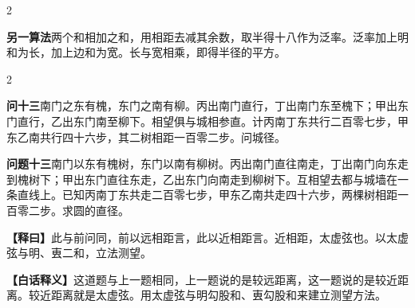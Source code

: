 \documentclass[11pt,a4paper]{article}
\newcommand{\WenQuestion}[1]{\textbf{\textcolor{classicalcolor}{#1}}}
\newcommand{\BaiQuestion}[1]{\textbf{\textcolor{moderncolor}{#1}}}
\newcommand{\WenExplain}{\textcolor{classicalcolor}{\textbf{【释曰】}}}
\newcommand{\BaiExplain}{\textcolor{moderncolor}{\textbf{【白话释义】}}}
\begin{document}
\begin{paracol}{2}
\begin{tcolorbox}[colback=blue!5,colframe=blue!40!black,boxrule=0.3pt]
\vspace{0.3em}
\textbf{另一算法}\quad 两个和相加之和，用相距去减其余数，取半得十八作为泛率。泛率加上明和为长，加上边和为宽。长与宽相乘，即得半径的平方。
\end{tcolorbox}

\end{paracol}

\vspace{0.5em}

\begin{paracol}{2}

\switchcolumn*
\begin{tcolorbox}[colback=red!3,colframe=red!30!black,boxrule=0.3pt]
\WenQuestion{问十三}\quad 南门之东有槐，东门之南有柳。丙出南门直行，丁出南门东至槐下；甲出东门直行，乙出东门南至柳下。相望俱与城相参直。计丙南丁东共行二百零七步，甲东乙南共行四十六步，其二树相距一百零二步。问城径。
\end{tcolorbox}
\switchcolumn
\begin{tcolorbox}[colback=blue!3,colframe=blue!30!black,boxrule=0.3pt]
\BaiQuestion{问题十三}\quad 南门以东有槐树，东门以南有柳树。丙出南门直往南走，丁出南门向东走到槐树下；甲出东门直往东走，乙出东门向南走到柳树下。互相望去都与城墙在一条直线上。已知丙南丁东共走二百零七步，甲东乙南共走四十六步，两棵树相距一百零二步。求圆的直径。
\end{tcolorbox}

\switchcolumn*
\begin{tcolorbox}[colback=red!5,colframe=red!30!black,boxrule=0.3pt]
\WenExplain\quad 此与前问同，前以远相距言，此以近相距言。近相距，太虚弦也。以太虚弦与明、叀二和，立法测望。
\end{tcolorbox}
\switchcolumn
\begin{tcolorbox}[colback=blue!5,colframe=blue!30!black,boxrule=0.3pt]
\BaiExplain\quad 这道题与上一题相同，上一题说的是较远距离，这一题说的是较近距离。较近距离就是太虚弦。用太虚弦与明勾股和、叀勾股和来建立测望方法。
\end{tcolorbox}

\end{paracol}

\vspace{0.3em}
\end{document}
